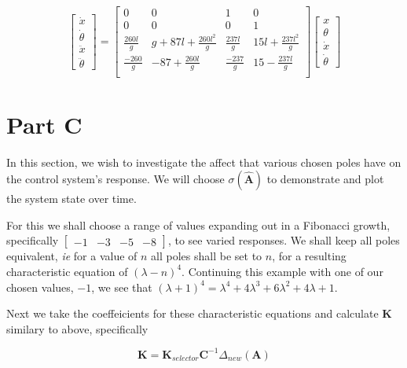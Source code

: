 \documentclass{article}
\begin{document}
\begin{equation}
    \begin{bmatrix}
        \dot{x} \\ \dot{\theta} \\ \ddot{x} \\ \ddot{\theta}
    \end{bmatrix}
    =
    \begin{bmatrix}
        0 & 0 & 1 & 0 \\
        0 & 0 & 0 & 1 \\[4pt]
        \frac{260l}{g} & g+87l+\frac{260l^2}{g} & \frac{237l}{g} & 15l + \frac{237l^2}{g} \\[4pt]
        \frac{-260}{g} & -87+\frac{260l}{g} & \frac{-237}{g} & 15 - \frac{237l}{g} \\[4pt]
    \end{bmatrix}
    \begin{bmatrix}
        x \\ \theta \\ \dot{x} \\ \dot{\theta}
    \end{bmatrix}
\end{equation}

\section*{Part C}

In this section, we wish to investigate the affect that various chosen poles have on the control system's response. We will choose $\sigma(\hat{\boldsymbol{A}})$ to demonstrate and plot the system state over time.

For this we shall choose a range of values expanding out in a Fibonacci growth, specifically $\begin{bmatrix} -1 & -3 & -5 & -8  \end{bmatrix}$, to see varied responses. We shall keep all poles equivalent, \textit{ie} for a value of $n$ all poles shall be set to $n$, for a resulting characteristic equation of $(\lambda-n)^4$. Continuing this example with one of our chosen values, $-1$, we see that $(\lambda+1)^4=\lambda^4+4\lambda^3+6\lambda^2+4\lambda+1$.

Next we take the coeffeicients for these characteristic equations and calculate $\boldsymbol{K}$ similary to above, specifically 

\begin{equation}
    \boldsymbol{K} = \boldsymbol{K}_{selector} \boldsymbol{C}^{-1} \Delta_{new}(\boldsymbol{A})
\end{equation}
\end{document}
